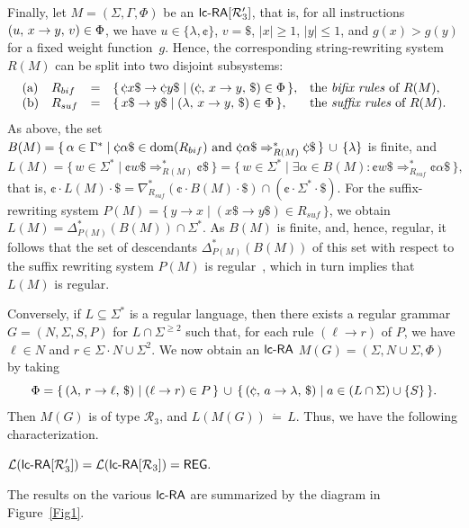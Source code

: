 Finally, let $M = (\Sigma,\Gamma,\Phi)$ be an $\lcRA[3']$, that is, for all instructions $(u,\,x\rightarrow y,\,v)\in \Phi$, we have $u\in\{\lambda,\cent\}$, $v=\$$, $|x|\ge 1$, $|y|\le 1$, and $g(x)>g(y)$ for a fixed weight function~$g$. Hence, the corresponding string-rewriting system $R(M)$ can be split into two disjoint subsystems:
$$\begin{array}{llcll}
{\rm (a)} & R_{bif} & = & \{\,\cent x\$ \to \cent y\$ \mid \rarule{\cent}{x}{y}{\$}\in \Phi\,\}, & \textup{the \emph{bifix rules} of }R(M),\\
{\rm (b)} & R_{suf}& = & \{\,x\$ \to y\$ \mid \rarule{\lambda}{x}{y}{\$}\in \Phi\,\}, & \textup{the \emph{suffix rules} of }R(M).\\
\end{array}$$
As above, the set $B(M) = \{\,\alpha\in\Gamma^*\mid \cent \alpha\$\in {\rm dom}(R_{bif}) \textup{ and } \cent \alpha\$\Rightarrow_{R(M)}^* \cent \$\,\}\,\cup\,\{\lambda\}$ is finite, and
$$
L(M)  =  \{\,w\in\Sigma^*\mid \cent w\$\Rightarrow_{R(M)}^*\cent\$\,\}
      =  \{\,w\in\Sigma^*\mid \exists \alpha\in B(M):\cent w\$\Rightarrow_{R_{suf}}^* \cent\alpha\$\,\},
$$
that is, $\cent\cdot L(M) \cdot \$ = \nabla_{R_{suf}}^*(\cent\cdot B(M)\cdot\$) \cap (\cent\cdot\Sigma^*\cdot\$).$ For the suffix-rewriting system $P(M) = \{\,y\to x\mid (x\$\to y\$)\in R_{suf}\,\}$, we obtain $L(M) = \Delta_{P(M)}^*(B(M))\cap\Sigma^*.$ As $B(M)$ is finite, and, hence, regular, it follows that the set of descendants $\Delta_{P(M)}^*(B(M))$ of this set with respect to the suffix rewriting system $P(M)$ is regular~\cite{Buc64}, which in turn implies that $L(M)$ is regular.

Conversely, if $L\subseteq\Sigma^*$ is a regular language, then there exists a regular grammar $G=(N,\Sigma,S,P)$ for $L\cap\Sigma^{\ge 2}$ such that, for each rule $(\ell\to r)$ of $P$, we have $\ell\in N$ and $r\in \Sigma\cdot N \cup \Sigma^2$. We now obtain an $\lcRA$ $M(G)=(\Sigma,N\cup\Sigma,\Phi)$ by taking
$$\Phi = \{\,\rarule{\lambda}{r}{\ell}{\$}\mid (\ell\to r)\in P\,\}\,\cup\,
         \{\,\rarule{\cent}{a}{\lambda}{\$}\mid a\in(L\cap\Sigma)\cup\{S\}\,\}.$$
Then $M(G)$ is of type $\mathcal{R}_3$, and $L(M(G))\,\dot{=}\,L$. Thus, we have the following characterization.
\begin{theorem}\label{PropR3}
${\mathcal L}(\lcRAp[3]) = {\mathcal L}(\lcRA[3]) = \Reg.$
\end{theorem}

The results on the various $\lcRA$ are summarized by the diagram in Figure~\ref{Fig1}.

